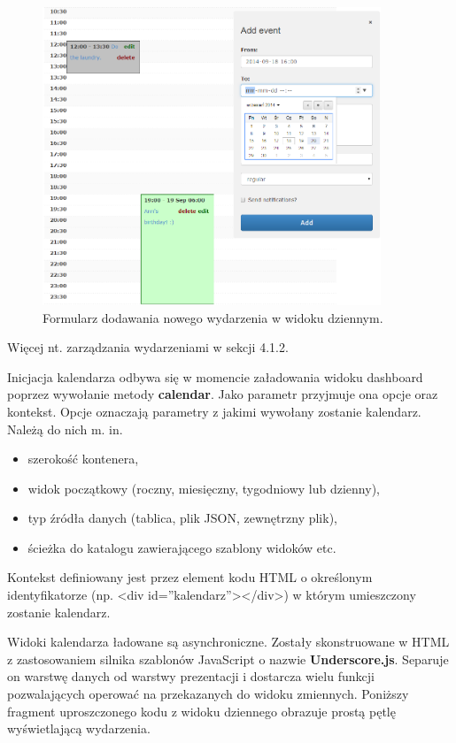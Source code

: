 \begin{figure}[H]
\centering
\includegraphics[width=0.9\textwidth]{add_event.png}
\caption{Formularz dodawania nowego wydarzenia w widoku dziennym.}
\end{figure}

Więcej nt. zarządzania wydarzeniami w sekcji 4.1.2.

Inicjacja kalendarza odbywa się w momencie załadowania widoku dashboard poprzez wywołanie metody \textbf{calendar}. Jako parametr przyjmuje ona opcje oraz kontekst. Opcje oznaczają parametry z jakimi wywołany zostanie kalendarz. Należą do nich m. in.

\begin{itemize}
\item szerokość kontenera,
\item widok początkowy (roczny, miesięczny, tygodniowy lub dzienny),
\item typ źródła danych (tablica, plik JSON, zewnętrzny plik),
\item ścieżka do katalogu zawierającego szablony widoków etc.
\end{itemize}

Kontekst definiowany jest przez element kodu HTML o określonym identyfikatorze (np. <div id=''kalendarz''></div>) w którym umieszczony zostanie kalendarz.

Widoki kalendarza ładowane są asynchroniczne. Zostały skonstruowane w HTML z zastosowaniem silnika szablonów JavaScript o nazwie \textbf{Underscore.js}\cite{underscore}. Separuje on warstwę danych od warstwy prezentacji i dostarcza wielu funkcji pozwalających operować na przekazanych do widoku zmiennych. Poniższy fragment uproszczonego kodu z widoku dziennego obrazuje prostą pętlę wyświetlającą wydarzenia.


